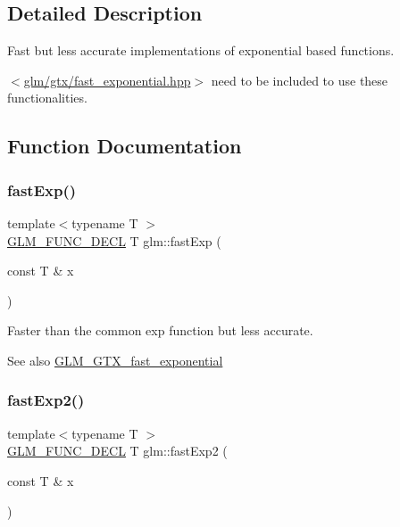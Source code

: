 \subsection{Detailed Description}
Fast but less accurate implementations of exponential based functions. 

$<$\hyperlink{fast__exponential_8hpp}{glm/gtx/fast\+\_\+exponential.\+hpp}$>$ need to be included to use these functionalities. 

\subsection{Function Documentation}
\mbox{\label{group__gtx__fast__exponential_ga22a548f1bf42c53898c140e56af16529}} 
\subsubsection{\texorpdfstring{fast\+Exp()}{fastExp()}}
{\footnotesize\ttfamily template$<$typename T $>$ \\
\hyperlink{setup_8hpp_ab2d052de21a70539923e9bcbf6e83a51}{G\+L\+M\+\_\+\+F\+U\+N\+C\+\_\+\+D\+E\+CL} T glm\+::fast\+Exp (\begin{DoxyParamCaption}\item[{const T \&}]{x }\end{DoxyParamCaption})}

Faster than the common exp function but less accurate. \begin{DoxySeeAlso}{See also}
\hyperlink{group__gtx__fast__exponential}{G\+L\+M\+\_\+\+G\+T\+X\+\_\+fast\+\_\+exponential} 
\end{DoxySeeAlso}
\mbox{\label{group__gtx__fast__exponential_ga62216328ac3af1811add813d0804437d}} 
\subsubsection{\texorpdfstring{fast\+Exp2()}{fastExp2()}}
{\footnotesize\ttfamily template$<$typename T $>$ \\
\hyperlink{setup_8hpp_ab2d052de21a70539923e9bcbf6e83a51}{G\+L\+M\+\_\+\+F\+U\+N\+C\+\_\+\+D\+E\+CL} T glm\+::fast\+Exp2 (\begin{DoxyParamCaption}\item[{const T \&}]{x }\end{DoxyParamCaption})}

